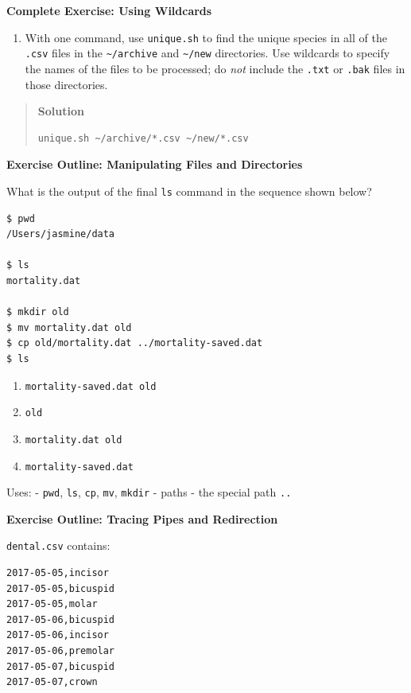 \documentclass[10pt,statementpaper]{memoir}
\providecommand{\tightlist}{%
  \setlength{\itemsep}{0pt}\setlength{\parskip}{0pt}}
\begin{document}
\textbf{Complete Exercise: Using Wildcards}

\begin{enumerate}
\def\labelenumi{\arabic{enumi}.}
\setcounter{enumi}{1}
\tightlist
\item
  With one command, use \texttt{unique.sh} to find the unique species in
  all of the \texttt{.csv} files in the
  \texttt{\textasciitilde{}/archive} and \texttt{\textasciitilde{}/new}
  directories. Use wildcards to specify the names of the files to be
  processed; do \emph{not} include the \texttt{.txt} or \texttt{.bak}
  files in those directories.
\end{enumerate}

\begin{quote}
\textbf{Solution}

\begin{verbatim}
unique.sh ~/archive/*.csv ~/new/*.csv
\end{verbatim}
\end{quote}

\textbf{Exercise Outline: Manipulating Files and Directories}

What is the output of the final \texttt{ls} command in the sequence
shown below?

\begin{verbatim}
$ pwd
/Users/jasmine/data

$ ls
mortality.dat

$ mkdir old
$ mv mortality.dat old
$ cp old/mortality.dat ../mortality-saved.dat
$ ls
\end{verbatim}

\begin{enumerate}
\def\labelenumi{\arabic{enumi}.}
\tightlist
\item
  \texttt{mortality-saved.dat\ old}
\item
  \texttt{old}
\item
  \texttt{mortality.dat\ old}
\item
  \texttt{mortality-saved.dat}
\end{enumerate}

Uses: - \texttt{pwd}, \texttt{ls}, \texttt{cp}, \texttt{mv},
\texttt{mkdir} - paths - the special path \texttt{..}

\textbf{Exercise Outline: Tracing Pipes and Redirection}

\texttt{dental.csv} contains:

\begin{verbatim}
2017-05-05,incisor
2017-05-05,bicuspid
2017-05-05,molar
2017-05-06,bicuspid
2017-05-06,incisor
2017-05-06,premolar
2017-05-07,bicuspid
2017-05-07,crown
\end{verbatim}
\end{document}
